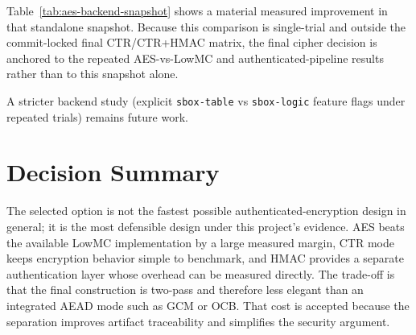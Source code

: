 Table~\ref{tab:aes-backend-snapshot} shows a material measured improvement in
that standalone snapshot. Because this comparison is single-trial and outside the
commit-locked final CTR/CTR+HMAC matrix, the final cipher decision is anchored to
the repeated AES-vs-LowMC and authenticated-pipeline results rather than to this
snapshot alone.

A stricter backend study (explicit \texttt{sbox-table} vs \texttt{sbox-logic}
feature flags under repeated trials) remains future work.

\section{Decision Summary}

The selected option is not the fastest possible authenticated-encryption design
in general; it is the most defensible design under this project's evidence. AES
beats the available LowMC implementation by a large measured margin, CTR mode
keeps encryption behavior simple to benchmark, and HMAC provides a separate
authentication layer whose overhead can be measured directly. The trade-off is
that the final construction is two-pass and therefore less elegant than an
integrated AEAD mode such as GCM or OCB. That cost is accepted because the
separation improves artifact traceability and simplifies the security argument.
